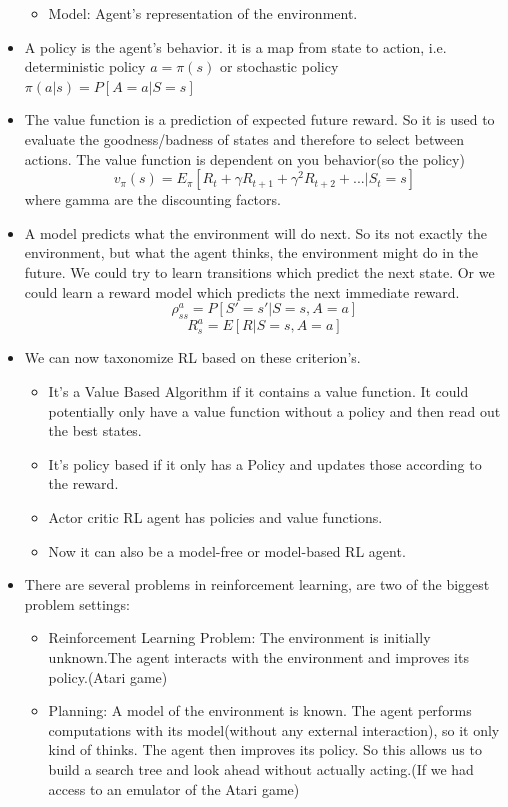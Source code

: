 \documentclass[a4paper]{article}
\begin{document}
\begin{itemize}
\begin{itemize}
\item Model: Agent's representation of the environment.
\end{itemize}
\item A policy is the agent's behavior. it is a map from state to action, i.e. deterministic policy $a = \pi(s)$ or stochastic policy $ \pi(a|s) = P[A=a|S=s]$
\item The value function is a prediction of expected future reward. So it is used to evaluate the goodness/badness of states and therefore to select between actions. The value function is dependent on you behavior(so the policy) $$ v_{\pi}(s) = E_{\pi}[R_t + \gamma R_{t+1} + \gamma^2R_{t+2}+...|S_t = s]$$
where gamma are the discounting factors. 
\item A model predicts what the environment will do next. So its not exactly the environment, but what the agent thinks, the environment might do in the future. We could try to learn transitions which predict the next state. Or we could learn a reward model which predicts the next immediate reward. 
$$\rho_{ss}^a = P[S'=s'|S=s,A=a]$$
$$R_s^a = E[R|S=s,A=a]$$
\item We can now taxonomize RL based on these criterion's. 
\begin{itemize}
\item It's a Value Based Algorithm if it contains a value function. It could potentially only have a value function without a policy and then read out the best states. 
\item It's policy based if it only has a Policy and updates those according to the reward. 
\item Actor critic RL agent has policies and value functions. 
\item Now it can also be a model-free or model-based RL agent. 
\end{itemize}
\item There are several problems in reinforcement learning, are two of the biggest problem settings: 
\begin{itemize}
\item Reinforcement Learning Problem: The environment is initially unknown.The agent interacts with the environment and improves its policy.(Atari game)
\item Planning: A model of the environment is known. The agent performs computations with its model(without any external interaction), so it only kind of thinks. The agent then improves its policy. So this allows us to build a search tree and look ahead without actually acting.(If we had access to an emulator of the Atari game)

\end{itemize}
\end{itemize}
\end{document}
